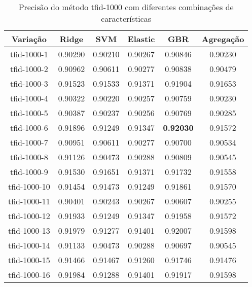 \begin{table}[H]
\centering
\begin{tabular}{|c| c c  c  c  c| }
\hline
Variação &  Ridge & SVM & Elastic & GBR & Agregação  \\ 
\hline
tfid-1000-1 & 0.90290 & 0.90210 & 0.90267 & 0.90846 & 0.90230 \\
\hline
tfid-1000-2 & 0.90962 & 0.90611 & 0.90277 & 0.90838 & 0.90479 \\
\hline
tfid-1000-3 & 0.91523 & 0.91533 & 0.91371 & 0.91904 & 0.91653 \\
\hline
tfid-1000-4 & 0.90322 & 0.90220 & 0.90257 & 0.90759 & 0.90230 \\
\hline
tfid-1000-5 & 0.90387 & 0.90237 & 0.90256 & 0.90769 & 0.90285 \\
\hline
tfid-1000-6 & 0.91896 & 0.91249 & 0.91347 & \textbf{0.92030} & 0.91572 \\
\hline
tfid-1000-7 & 0.90951 & 0.90611 & 0.90277 & 0.90700 & 0.90534 \\
\hline
tfid-1000-8 & 0.91126 & 0.90473 & 0.90288 & 0.90809 & 0.90545 \\
\hline
tfid-1000-9 & 0.91530 & 0.91651 & 0.91371 & 0.91732 & 0.91558 \\
\hline
tfid-1000-10 & 0.91454 & 0.91473 & 0.91249 & 0.91861 & 0.91570 \\
\hline
tfid-1000-11 & 0.90401 & 0.90243 & 0.90267 & 0.90607 & 0.90255 \\
\hline
tfid-1000-12 & 0.91933 & 0.91249 & 0.91347 & 0.91958 & 0.91572 \\
\hline
tfid-1000-13 & 0.91979 & 0.91277 & 0.91401 & 0.92007 & 0.91598 \\
\hline
tfid-1000-14 & 0.91133 & 0.90473 & 0.90288 & 0.90697 & 0.90545 \\
\hline
tfid-1000-15 & 0.91466 & 0.91467 & 0.91260 & 0.91746 & 0.91476 \\
\hline
tfid-1000-16 & 0.91984 & 0.91288 & 0.91401 & 0.91917 & 0.91598 \\
\hline
\end{tabular}
\caption{Precisão do método tfid-1000 com diferentes combinações de características}
\label{tab:precisiontfid1000}
\end{table}

